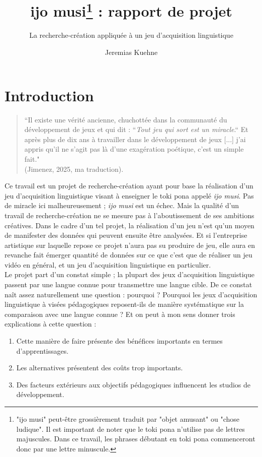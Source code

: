 \documentclass{scrartcl}
\title{ijo musi\footnote{"ijo musi" peut-être grossièrement traduit par "objet amusant" ou "chose ludique". Il est important de noter que le toki pona n'utilise pas de lettres majuscules. Dans ce travail, les phrases débutant en toki pona commenceront donc par une lettre minuscule.} : rapport de projet}
\subtitle{La recherche-création appliquée à un jeu d'acquisition linguistique}
\author{Jeremias Kuehne}
\begin{document}
	\maketitle
	
	\section*{Introduction}
	\begin{quote}
	“Il existe une vérité ancienne, chuchottée dans la communauté du développement de jeux et qui dit : “\textit{Tout jeu qui sort est un miracle}.“ Et après plus de dix ans à travailler dans le développement de jeux [...] j'ai appris qu'il ne s'agit pas là d'une exagération poétique, c'est un simple fait."\\ 
	(Jimenez, 2025, ma traduction). 
	\end{quote}
	Ce travail est un projet de recherche-création ayant pour base la réalisation d'un jeu d'acquisition linguistique visant à enseigner le toki pona appelé \textit{ijo musi}. Pas de miracle ici malheureusement ; \textit{ijo musi} est un échec. Mais la qualité d'un travail de recherche-création ne se mesure pas à l'aboutissement de ses ambitions créatives. Dans le cadre d'un tel projet, la réalisation d'un jeu n'est qu'un moyen de manifester des données qui peuvent ensuite être analysées. Et si l'entreprise artistique sur laquelle repose ce projet n'aura pas su produire de jeu, elle aura en revanche fait émerger quantité de données sur ce que c'est que de réaliser un jeu vidéo en général, et un jeu d'acquisition linguistique en particulier. \\
	Le projet part d'un constat simple ; la plupart des jeux d'acquisition linguistique passent par une langue connue pour transmettre une langue cible. De ce constat naît assez naturellement une question : pourquoi ? Pourquoi les jeux d’acquisition linguistique à visées pédagogiques reposent-ils de manière systématique sur la comparaison avec une langue connue ? Et on peut à mon sens donner trois explications à cette question :
	\begin{enumerate}
		\item Cette manière de faire présente des bénéfices importants en termes d’apprentissages.
		\item Les alternatives présentent des coûts trop importants.
		\item Des facteurs extérieurs aux objectifs pédagogiques influencent les studios de développement.
	\end{enumerate}
	
\end{document}
